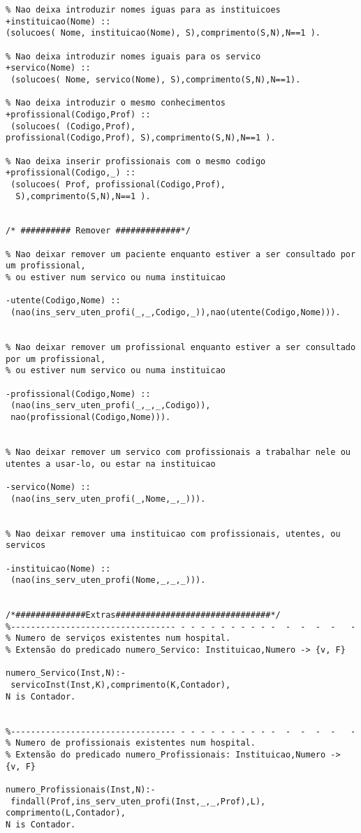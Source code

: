\documentclass[pdftex,12pt,a4paper]{report}
\begin{document}
\begin{appendices}
\begin{Verbatim}
% Nao deixa introduzir nomes iguas para as instituicoes
+instituicao(Nome) :: 
(solucoes( Nome, instituicao(Nome), S),comprimento(S,N),N==1 ). 

% Nao deixa introduzir nomes iguais para os servico
+servico(Nome) ::
 (solucoes( Nome, servico(Nome), S),comprimento(S,N),N==1). 

% Nao deixa introduzir o mesmo conhecimentos
+profissional(Codigo,Prof) ::
 (solucoes( (Codigo,Prof), 
profissional(Codigo,Prof), S),comprimento(S,N),N==1 ).

% Nao deixa inserir profissionais com o mesmo codigo
+profissional(Codigo,_) ::
 (solucoes( Prof, profissional(Codigo,Prof),
  S),comprimento(S,N),N==1 ).


/* ########## Remover #############*/

% Nao deixar remover um paciente enquanto estiver a ser consultado por um profissional, 
% ou estiver num servico ou numa instituicao

-utente(Codigo,Nome) ::
 (nao(ins_serv_uten_profi(_,_,Codigo,_)),nao(utente(Codigo,Nome))).


% Nao deixar remover um profissional enquanto estiver a ser consultado por um profissional, 
% ou estiver num servico ou numa instituicao

-profissional(Codigo,Nome) ::
 (nao(ins_serv_uten_profi(_,_,_,Codigo)),
 nao(profissional(Codigo,Nome))).


% Nao deixar remover um servico com profissionais a trabalhar nele ou utentes a usar-lo, ou estar na instituicao

-servico(Nome) ::
 (nao(ins_serv_uten_profi(_,Nome,_,_))).


% Nao deixar remover uma instituicao com profissionais, utentes, ou servicos

-instituicao(Nome) ::
 (nao(ins_serv_uten_profi(Nome,_,_,_))).


/*##############Extras###############################*/
%--------------------------------- - - - - - - - - - -  -  -  -  -   -
% Numero de serviços existentes num hospital.
% Extensão do predicado numero_Servico: Instituicao,Numero -> {v, F}

numero_Servico(Inst,N):-
 servicoInst(Inst,K),comprimento(K,Contador), 
N is Contador.


%--------------------------------- - - - - - - - - - -  -  -  -  -   -
% Numero de profissionais existentes num hospital.
% Extensão do predicado numero_Profissionais: Instituicao,Numero -> {v, F}

numero_Profissionais(Inst,N):-
 findall(Prof,ins_serv_uten_profi(Inst,_,_,Prof),L),
comprimento(L,Contador),
N is Contador.


\end{Verbatim}
\end{appendices}
\end{document}
